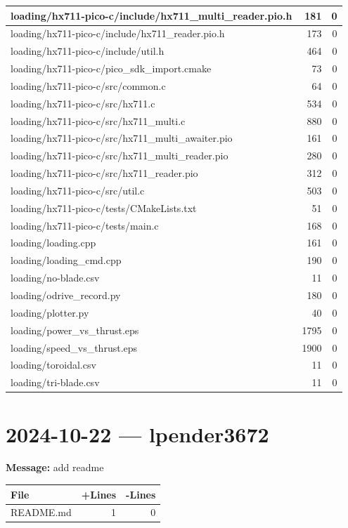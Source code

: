 \documentclass{article}
\begin{document}
\begin{longtable}{|p{10cm}|r|r|}
\hline
loading/hx711-pico-c/include/hx711\_multi\_reader.pio.h & 181 & 0 \\
\hline
loading/hx711-pico-c/include/hx711\_reader.pio.h & 173 & 0 \\
\hline
loading/hx711-pico-c/include/util.h & 464 & 0 \\
\hline
loading/hx711-pico-c/pico\_sdk\_import.cmake & 73 & 0 \\
\hline
loading/hx711-pico-c/src/common.c & 64 & 0 \\
\hline
loading/hx711-pico-c/src/hx711.c & 534 & 0 \\
\hline
loading/hx711-pico-c/src/hx711\_multi.c & 880 & 0 \\
\hline
loading/hx711-pico-c/src/hx711\_multi\_awaiter.pio & 161 & 0 \\
\hline
loading/hx711-pico-c/src/hx711\_multi\_reader.pio & 280 & 0 \\
\hline
loading/hx711-pico-c/src/hx711\_reader.pio & 312 & 0 \\
\hline
loading/hx711-pico-c/src/util.c & 503 & 0 \\
\hline
loading/hx711-pico-c/tests/CMakeLists.txt & 51 & 0 \\
\hline
loading/hx711-pico-c/tests/main.c & 168 & 0 \\
\hline
loading/loading.cpp & 161 & 0 \\
\hline
loading/loading\_cmd.cpp & 190 & 0 \\
\hline
loading/no-blade.csv & 11 & 0 \\
\hline
loading/odrive\_record.py & 180 & 0 \\
\hline
loading/plotter.py & 40 & 0 \\
\hline
loading/power\_vs\_thrust.eps & 1795 & 0 \\
\hline
loading/speed\_vs\_thrust.eps & 1900 & 0 \\
\hline
loading/toroidal.csv & 11 & 0 \\
\hline
loading/tri-blade.csv & 11 & 0 \\
\hline
\end{longtable}

\section*{2024-10-22 --- lpender3672}
\textbf{Message:} add readme

\begin{longtable}{|p{10cm}|r|r|}
\hline \textbf{File} & \textbf{+Lines} & \textbf{-Lines} \\
\hline
README.md & 1 & 0 \\
\hline
\end{longtable}
\end{document}
